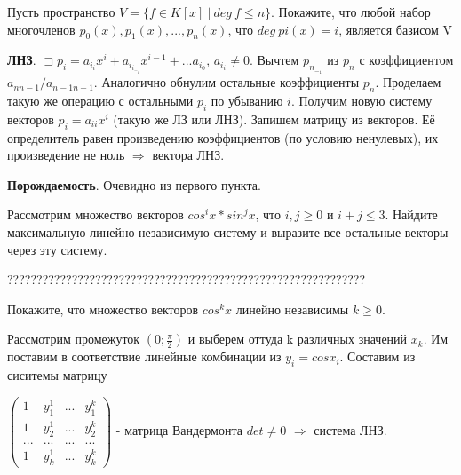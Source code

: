 \documentclass[12pt]{article}
\newenvironment{problem}[2][Problem]
{\begin{trivlist}\item[{\bfseries #1} {\bfseries #2.}]}{\end{trivlist}}
\newenvironment{solutions}[2][Solutions]
{\begin{trivlist}\item[{\bfseries #1} {\bfseries #2.}]}{\end{trivlist}}
\begin{document}
\begin{problem}{1} 
Пусть пространство $V = \{ f \in K[x]\ |\ deg\ f \leqslant n \} $. Покажите, что любой набор многочленов $p_0(x), p_1(x), . . . , p_n(x)$,
что $deg\ pi(x) = i$, является базисом V
\end{problem}

\begin{solutions}{1} 
\textbf{ЛНЗ}. $\sqsupset p_i = a_i_i x^i + a_i_i_-_1 x^{i-1} +...a_i_0$, $a_i_i \neq 0$. Вычтем $p_n_-_1$ из $p_n$ с коэффициентом $a_{n n-1}/a_{n-1 n-1}$. Аналогично обнулим остальные коэффициенты $p_n$. Проделаем такую же операцию с остальными $p_i$ по убыванию $i$. Получим новую систему векторов $p_i = a_{ii} x^i$ (такую же ЛЗ или ЛНЗ). Запишем матрицу из векторов. Её определитель равен произведению коэффициентов (по условию ненулевых), их произведение не ноль $\Rightarrow$ вектора ЛНЗ.

\textbf{Порождаемость}. Очевидно из первого пункта.
\end{solutions}

\begin{problem}{2} 
Рассмотрим множество векторов $cos^i x * sin^j x$, что $i, j \geqslant 0$ и $i + j \leqslant 3$. Найдите максимальную линейно
независимую систему и выразите все остальные векторы через эту систему.
\end{problem}

\begin{solutions}{2} 
?????????????????????????????????????????????????????????????
\end{solutions}

\begin{problem}{3} 
Покажите, что множество векторов $cos^k x$ линейно независимы $k \geqslant 0$.
\end{problem}

\begin{solutions}{3} 
Рассмотрим промежуток $(0;\frac{\pi}{2})$ и выберем оттуда k различных значений $x_k$. Им поставим в соответствие линейные комбинации  из $y_i=cos x_i$. Составим из сиситемы матрицу

$\begin{pmatrix}
1 & y_1 ^ 1 & ... & y_1 ^k\\
1 & y_2 ^ 1 & ... & y_2 ^k\\
... & ... & ... & ...\\
1 & y_k ^ 1 & ... & y_k ^k
\end{pmatrix}$
- матрица Вандермонта $det \neq 0$ $\Rightarrow$ система ЛНЗ.
\end{solutions}
\end{document}
